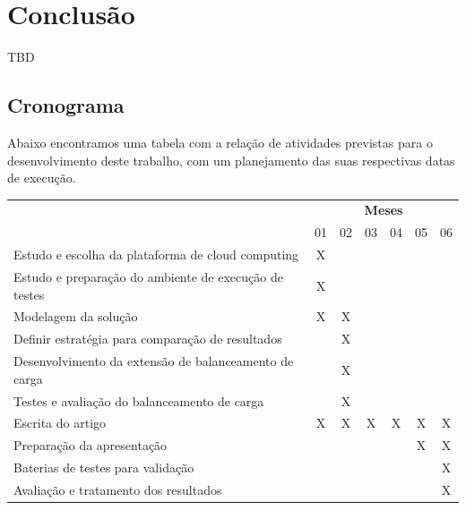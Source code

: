 \documentclass[twoside,english,brazilian]{UNISINOSmonografia}
\begin{document}
\chapter{Conclusão}
\label{conclusion}

TBD
\section{Cronograma}
Abaixo encontramos uma tabela com a relação de atividades previstas para o desenvolvimento deste trabalho, com um planejamento das suas respectivas datas de execução.

\begin{tabular}{|l|c|c|c|c|c|c|}\hline
 & \multicolumn{6}{c|}{\textbf{Meses}}\\ \cline{2-7}
\raisebox{1.5ex}{\textbf{Etapa}} & 01 & 02 & 03 & 04 & 05 & 06 										\\ \hline

Estudo e escolha da plataforma de cloud computing 						& X &   &   &   &   &		  	\\ \hline
Estudo e preparação do ambiente de execução de testes            		& X &   &   &   &   & 			\\ \hline
Modelagem da solução			 										& X & X &   &   &   &			\\ \hline
Definir estratégia para comparação de resultados						&   & X &   &   &   & 			\\ \hline
Desenvolvimento da extensão de balanceamento de carga					& 	& X &	&   &   &			\\ \hline
Testes e avaliação do balanceamento de carga							& 	& X & 	& 	& 	&  		   \\ \hline
Escrita do artigo														& X	& X & X & X & X & X			\\ \hline
Preparação da apresentação												& 	&   &   &   & X & X			\\ \hline
Baterias de testes para validação 										& 	& 	& 	& 	& 	& X 	   \\ \hline
Avaliação e tratamento dos resultados									& 	& 	& 	& 	& 	& X 	   \\ \hline

\end{tabular} 

\label{t_cronograma}


\end{document}

